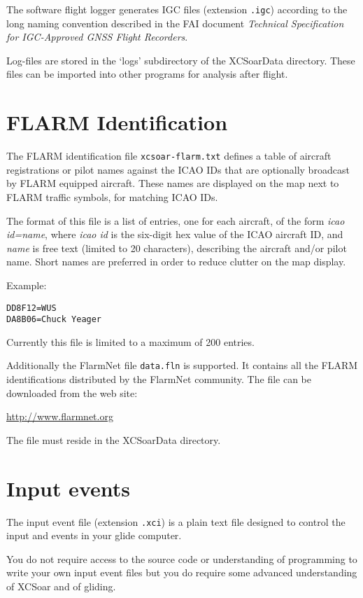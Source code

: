 The software flight logger generates IGC files (extension \verb|.igc|)
according to the long naming convention described in the FAI 
document {\em Technical Specification for IGC-Approved GNSS Flight Recorders}.  

Log-files are stored in the `logs' subdirectory of the XCSoarData directory.
These files can be imported into other programs for analysis after flight.

\section{FLARM Identification}\label{sec:flarm-ident-file}

The FLARM identification file \verb|xcsoar-flarm.txt| defines a table
of aircraft registrations or pilot names against the ICAO IDs that are
optionally broadcast by FLARM equipped aircraft.  These names are
displayed on the map next to FLARM traffic symbols, for matching ICAO
IDs.

The format of this file is a list of entries, one for each aircraft,
of the form {\em icao id=name}, where {\em icao id} is the six-digit
hex value of the ICAO aircraft ID, and {\em name} is free text
(limited to 20 characters), describing the aircraft and/or pilot name.
Short names are preferred in order to reduce clutter on the map
display.

Example:
\begin{verbatim}
DD8F12=WUS
DA8B06=Chuck Yeager
\end{verbatim}

Currently this file is limited to a maximum of 200 entries.

Additionally the FlarmNet file \verb|data.fln| is supported. It contains all 
the FLARM identifications distributed by the FlarmNet community. The file can 
be downloaded from the web site:

\url{http://www.flarmnet.org}

The file must reside in the XCSoarData directory.


\section{Input events}

The input event file (extension \verb|.xci|) is a plain text file
designed to control the input and events in your glide computer.

You do not require access to the source code or understanding of
programming to write your own input event files but you do require
some advanced understanding of XCSoar and of gliding.

